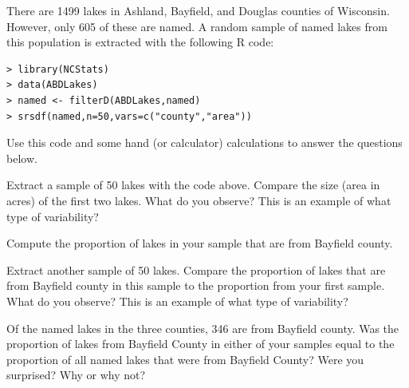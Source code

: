 \documentclass[10pt,openany]{book}\usepackage[]{graphicx}\usepackage[]{color}
\makeatletter
\newenvironment{kframe}{%
 \def\at@end@of@kframe{}%
 \ifinner\ifhmode%
  \def\at@end@of@kframe{\end{minipage}}%
  \begin{minipage}{\columnwidth}%
 \fi\fi%
 \def\FrameCommand##1{\hskip\@totalleftmargin \hskip-\fboxsep
 \colorbox{shadecolor}{##1}\hskip-\fboxsep
     \hskip-\linewidth \hskip-\@totalleftmargin \hskip\columnwidth}%
 \MakeFramed {\advance\hsize-\width
   \@totalleftmargin\z@ \linewidth\hsize
   \@setminipage}}%
 {\par\unskip\endMakeFramed%
 \at@end@of@kframe}
\newenvironment{knitrout}{}{} %
\makeatother
\begin{document}

\begin{exsection}


  \item \label{revex:WhyStatsLakes} There are 1499 lakes in Ashland, Bayfield, and Douglas counties of Wisconsin.  However, only 605 of these are named.  A random sample of named lakes from this population is extracted with the following R code:
\vspace{-12pt}
\begin{knitrout}
\color{fgcolor}\begin{kframe}
\begin{verbatim}
> library(NCStats)
> data(ABDLakes)
> named <- filterD(ABDLakes,named)
> srsdf(named,n=50,vars=c("county","area"))
\end{verbatim}
\end{kframe}
\end{knitrout}
Use this code and some hand (or calculator) calculations to answer the questions below. 
    \begin{Enumerate}
      \item Extract a sample of 50 lakes with the code above.  Compare the size (area in acres) of the first two lakes.  What do you observe?  This is an example of what type of variability?
      \item Compute the proportion of lakes in your sample that are from Bayfield county.
      \item Extract another sample of 50 lakes.  Compare the proportion of lakes that are from Bayfield county in this sample to the proportion from your first sample.  What do you observe?  This is an example of what type of variability?
      \item Of the named lakes in the three counties, 346 are from Bayfield county.  Was the proportion of lakes from Bayfield County in either of your samples equal to the proportion of all named lakes that were from Bayfield County?  Were you surprised?  Why or why not?
    \end{Enumerate}
\end{exsection}
\end{document}

